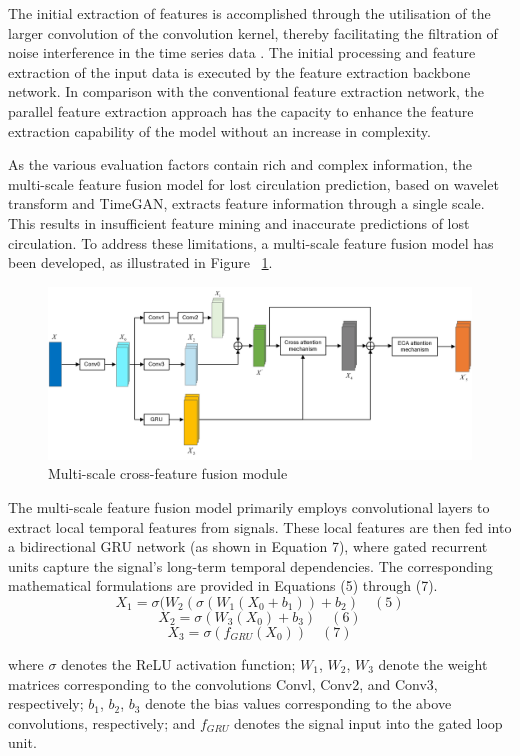 \documentclass[journal,article,submit,pdftex,moreauthors]{Definitions/mdpi}
\begin{document}
The initial extraction of features is accomplished through the utilisation of the larger convolution of the convolution kernel, thereby facilitating the filtration of noise interference in the time series data \cite{meizhou2024}. The initial processing and feature extraction of the input data is executed by the feature extraction backbone network. In comparison with the conventional feature extraction network, the parallel feature extraction approach has the capacity to enhance the feature extraction capability of the model without an increase in complexity\cite{lishutao2018}.

As the various evaluation factors contain rich and complex information, the multi-scale feature fusion model for lost circulation prediction, based on wavelet transform and TimeGAN, extracts feature information through a single scale. This results in insufficient feature mining and inaccurate predictions of lost circulation. To address these limitations, a multi-scale feature fusion model has been developed, as illustrated in Figure ~\ref{fig:Multi-scale cross-feature fusion module}.

\begin{figure}[H]
    \centering
    \includegraphics[width=0.75\linewidth]{图片/多尺度特征注意力.png}
    \caption{Multi-scale cross-feature fusion module}
    \label{fig:Multi-scale cross-feature fusion module}
\end{figure}


The multi-scale feature fusion model primarily employs convolutional layers to extract local temporal features from signals.  These local features are then fed into a bidirectional GRU network (as shown in Equation 7), where gated recurrent units capture the signal's long-term temporal dependencies.  The corresponding mathematical formulations are provided in Equations (5) through (7).
\[{{X}_{1}}=\sigma ({{W}_{2}}(\sigma ({{W}_{1}}({{X}_{0}}+{{b}_{1}}))+{{b}_{2}})\quad (5)\]
	\[{{X}_{2}}=\sigma ({{W}_{3}}({{X}_{0}})+{{b}_{3}})\quad (6)\]
	\[{{X}_{3}}=\sigma ({{f}_{GRU}}({{X}_{0}}))\quad (7)\]

where $\sigma$ denotes the ReLU activation function; \({{W}_{1}}\), \({{W}_{2}}\),  \({{W}_{3}}\) denote the weight matrices corresponding to the convolutions Convl, Conv2, and Conv3, respectively; \({{b}_{1}}\), \({{b}_{2}}\), \({{b}_{3}}\) denote the bias values corresponding to the above convolutions, respectively; and \({{f}_{GRU}}\) denotes the signal input into the gated loop unit.
\end{document}
